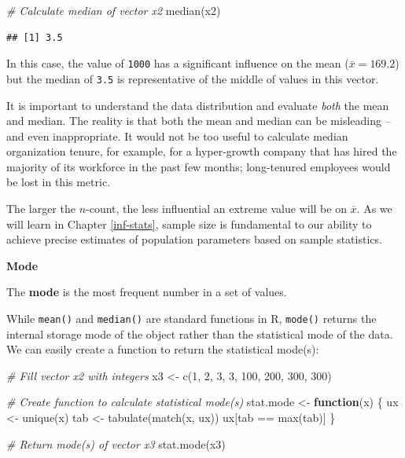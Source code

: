 \documentclass[
]{book}
\newenvironment{Shaded}{\begin{snugshade}}{\end{snugshade}}
\newcommand{\CommentTok}[1]{\textcolor[rgb]{0.56,0.35,0.01}{\textit{#1}}}
\newcommand{\ControlFlowTok}[1]{\textcolor[rgb]{0.13,0.29,0.53}{\textbf{#1}}}
\newcommand{\DecValTok}[1]{\textcolor[rgb]{0.00,0.00,0.81}{#1}}
\newcommand{\FunctionTok}[1]{\textcolor[rgb]{0.00,0.00,0.00}{#1}}
\newcommand{\NormalTok}[1]{#1}
\newcommand{\OtherTok}[1]{\textcolor[rgb]{0.56,0.35,0.01}{#1}}
\newcommand{\SpecialCharTok}[1]{\textcolor[rgb]{0.00,0.00,0.00}{#1}}
\begin{document}
\begin{Shaded}
\begin{Highlighting}[]
\CommentTok{\# Calculate median of vector x2}
\FunctionTok{median}\NormalTok{(x2)}
\end{Highlighting}
\end{Shaded}

\begin{verbatim}
## [1] 3.5
\end{verbatim}

In this case, the value of \texttt{1000} has a significant influence on the mean (\(\bar{x} = 169.2\)) but the median of \texttt{3.5} is representative of the middle of values in this vector.

It is important to understand the data distribution and evaluate \emph{both} the mean and median. The reality is that both the mean and median can be misleading -- and even inappropriate. It would not be too useful to calculate median organization tenure, for example, for a hyper-growth company that has hired the majority of its workforce in the past few months; long-tenured employees would be lost in this metric.

The larger the \(n\)-count, the less influential an extreme value will be on \(\bar{x}\). As we will learn in Chapter \ref{inf-stats}, sample size is fundamental to our ability to achieve precise estimates of population parameters based on sample statistics.

\textbf{Mode}

The \textbf{mode} is the most frequent number in a set of values.

While \texttt{mean()} and \texttt{median()} are standard functions in R, \texttt{mode()} returns the internal storage mode of the object rather than the statistical mode of the data. We can easily create a function to return the statistical mode(s):

\begin{Shaded}
\begin{Highlighting}[]
\CommentTok{\# Fill vector x2 with integers}
\NormalTok{x3 }\OtherTok{\textless{}{-}} \FunctionTok{c}\NormalTok{(}\DecValTok{1}\NormalTok{, }\DecValTok{2}\NormalTok{, }\DecValTok{3}\NormalTok{, }\DecValTok{3}\NormalTok{, }\DecValTok{100}\NormalTok{, }\DecValTok{200}\NormalTok{, }\DecValTok{300}\NormalTok{, }\DecValTok{300}\NormalTok{)}

\CommentTok{\# Create function to calculate statistical mode(s)}
\NormalTok{stat.mode }\OtherTok{\textless{}{-}} \ControlFlowTok{function}\NormalTok{(x) \{}
\NormalTok{  ux }\OtherTok{\textless{}{-}} \FunctionTok{unique}\NormalTok{(x)}
\NormalTok{  tab }\OtherTok{\textless{}{-}} \FunctionTok{tabulate}\NormalTok{(}\FunctionTok{match}\NormalTok{(x, ux))}
\NormalTok{  ux[tab }\SpecialCharTok{==} \FunctionTok{max}\NormalTok{(tab)]}
\NormalTok{\}}

\CommentTok{\# Return mode(s) of vector x3}
\FunctionTok{stat.mode}\NormalTok{(x3)}
\end{Highlighting}
\end{Shaded}
\end{document}
